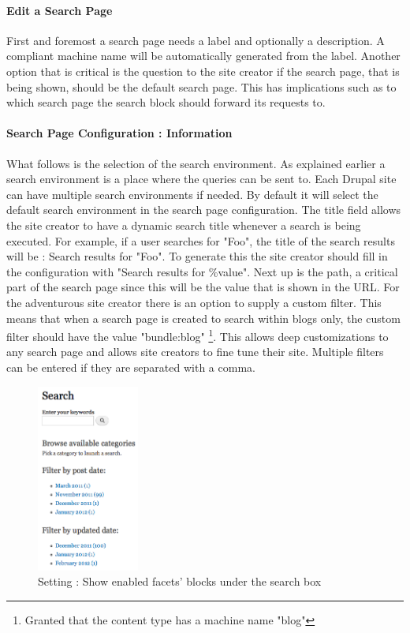 \paragraph{Edit a Search Page} First and foremost a search page needs a label and optionally a description. A compliant machine name will be automatically generated from the label. Another option that is critical is the question to the site creator if the search page, that is being shown, should be the default search page. This has implications such as to which search page the search block should forward its requests to. 

\paragraph{Search Page Configuration :  Information} What follows is the selection of the search environment. As explained earlier a search environment is a place where the queries can be sent to. Each Drupal site can have multiple search environments if needed. By default it will select the default search environment in the search page configuration. The title field allows the site creator to have a dynamic search title whenever a search is being executed. For example, if a user searches for "Foo", the title of the search results will be : Search results for "Foo". To generate this the site creator should fill in the configuration with "Search results for \%value". Next up is the path, a critical part of the search page since this will be the value that is shown in the URL. For the adventurous site creator there is an option to supply a custom filter. This means that when a search page is created to search within blogs only, the custom filter should have the value "bundle:blog" \footnote{Granted that the content type has a machine name "blog"}. This allows deep customizations to any search page and allows site creators to fine tune their site. Multiple filters can be entered if they are separated with a comma.

\begin{figure}
\begin{center}
     \includegraphics[width=0.3\textwidth]{images/implementation/blocks_under_search_box.png}
     \caption{Setting : Show enabled facets' blocks under the search box}
\end{center}
\end{figure}
